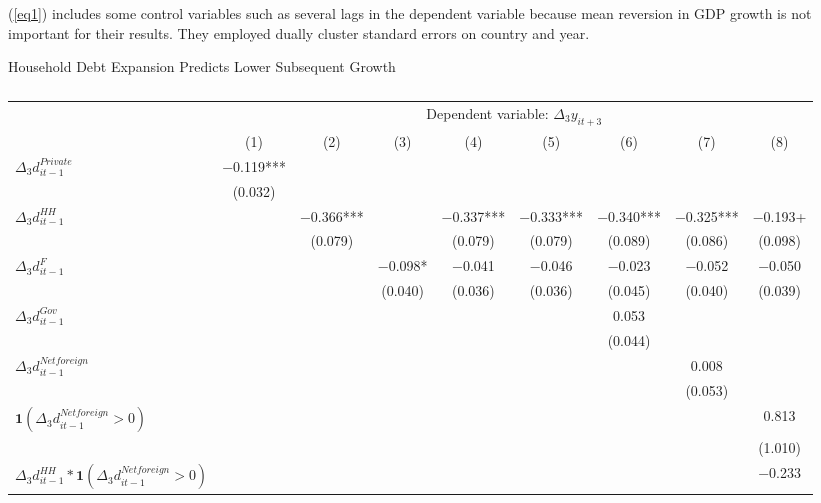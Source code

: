 \documentclass{ltjarticle}
\begin{document}
(\ref{eq1}) includes some control variables such as several lags in the dependent variable because mean reversion in GDP growth is not important for their results. They employed dually cluster standard errors on country and year. 

\begin{sidewaystable}
    \small
    \begin{center}
        \caption{}{Household Debt Expansion Predicts Lower Subsequent Growth}
        \label{table3}
        \begin{tabular}[t]{lcccccccc}
            \toprule
            & \multicolumn{8}{c}{Dependent variable: $\Delta_{3}y_{it+3}$} \\
            \cline{2-9}
              & (1) & (2) & (3) & (4) & (5) & (6) & (7) & (8)\\
            \midrule
            $\Delta_{3}d_{it-1}^{Private} $ & \num{-0.119}*** &  &  &  &  &  &  & \\
             & (\num{0.032}) &  &  &  &  &  &  & \\
            $\Delta_{3}d_{it-1}^{HH} $ &  & \num{-0.366}*** &  & \num{-0.337}*** & \num{-0.333}*** & \num{-0.340}*** & \num{-0.325}*** & \num{-0.193}+\\
             &  & (\num{0.079}) &  & (\num{0.079}) & (\num{0.079}) & (\num{0.089}) & (\num{0.086}) & (\num{0.098})\\
            $\Delta_{3}d_{it-1}^{F} $ &  &  & \num{-0.098}* & \num{-0.041} & \num{-0.046} & \num{-0.023} & \num{-0.052} & \num{-0.050}\\
             &  &  & (\num{0.040}) & (\num{0.036}) & (\num{0.036}) & (\num{0.045}) & (\num{0.040}) & (\num{0.039})\\
            $\Delta_{3}d_{it-1}^{Gov} $ &  &  &  &  &  & \num{0.053} &  & \\
             &  &  &  &  &  & (\num{0.044}) &  & \\
            $\Delta_{3}d_{it-1}^{Netforeign} $ &  &  &  &  &  &  & \num{0.008} & \\
             &  &  &  &  &  &  & (\num{0.053}) & \\
            $\mathbf{1}\left(\Delta_{3}d_{it-1}^{Netforeign}>0\right) $ &  &  &  &  &  &  &  & \num{0.813}\\
             &  &  &  &  &  &  &  & (\num{1.010})\\
            $\Delta_{3}d_{it-1}^{HH}\ast \mathbf{1}\left(\Delta_{3}d_{it-1}^{Netforeign}>0\right) $ &  &  &  &  &  &  &  & \num{-0.233}\\

\end{tabular}
\end{center}
\end{sidewaystable}
\end{document}
